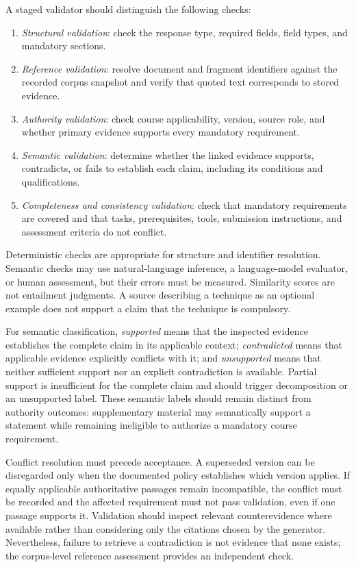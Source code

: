 \documentclass[12pt,a4paper]{report}
\numberwithin{equation}{chapter}
\begin{document}
A staged validator should distinguish the following checks:

\begin{enumerate}
    \item \textit{Structural validation}: check the response type, required fields, field types, and mandatory sections.
    \item \textit{Reference validation}: resolve document and fragment identifiers against the recorded corpus snapshot and verify that quoted text corresponds to stored evidence.
    \item \textit{Authority validation}: check course applicability, version, source role, and whether primary evidence supports every mandatory requirement.
    \item \textit{Semantic validation}: determine whether the linked evidence supports, contradicts, or fails to establish each claim, including its conditions and qualifications.
    \item \textit{Completeness and consistency validation}: check that mandatory requirements are covered and that tasks, prerequisites, tools, submission instructions, and assessment criteria do not conflict.
\end{enumerate}

Deterministic checks are appropriate for structure and identifier resolution. Semantic checks may use natural-language inference, a language-model evaluator, or human assessment, but their errors must be measured. Similarity scores are not entailment judgments. A source describing a technique as an optional example does not support a claim that the technique is compulsory.

For semantic classification, \textit{supported} means that the inspected evidence establishes the complete claim in its applicable context; \textit{contradicted} means that applicable evidence explicitly conflicts with it; and \textit{unsupported} means that neither sufficient support nor an explicit contradiction is available. Partial support is insufficient for the complete claim and should trigger decomposition or an unsupported label. These semantic labels should remain distinct from authority outcomes: supplementary material may semantically support a statement while remaining ineligible to authorize a mandatory course requirement.

Conflict resolution must precede acceptance. A superseded version can be disregarded only when the documented policy establishes which version applies. If equally applicable authoritative passages remain incompatible, the conflict must be recorded and the affected requirement must not pass validation, even if one passage supports it. Validation should inspect relevant counterevidence where available rather than considering only the citations chosen by the generator. Nevertheless, failure to retrieve a contradiction is not evidence that none exists; the corpus-level reference assessment provides an independent check.
\end{document}
